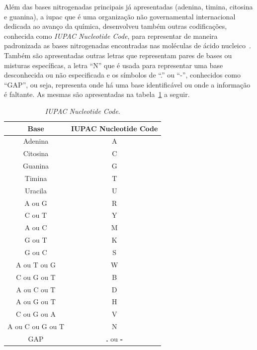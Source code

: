 Além das bases nitrogenadas principais já apresentadas (\gls{adenina}, \gls{timina}, \gls{citosina} e \gls{guanina}), a \gls{iupac} que é uma organização não governamental internacional dedicada ao avanço da química, desenvolveu também outras codificações, conhecida como \textit{IUPAC Nucleotide Code}, para representar de maneira padronizada as bases nitrogenadas encontradas nas moléculas de ácido nucleico~\cite{iupac_cornish_1985, iupac_hoppe_1986}. Também são apresentadas outras letras que representam pares de bases ou misturas específicas, a letra ``N'' que é usada para representar uma base desconhecida ou não especificada e os símbolos de ``.'' ou ``-'', conhecidos como ``GAP'', ou seja, representa onde há uma base identificável ou onde a informação é faltante\cite{iupac_cornish_1985}. As mesmas são apresentadas na tabela~\ref{tab:iupacNucleotideCode} a seguir.

\begin{table}[htb]
  \caption{\textit{IUPAC Nucleotide Code}.}
  \begin{center}
    \begin{tabular}{c|c}
      \hline
      Base             & IUPAC Nucleotide Code    \\
      \hline
      Adenina          & A                        \\
      Citosina         & C                        \\
      Guanina          & G                        \\
      Timina           & T                        \\
      Uracila          & U                        \\
      A ou G           & R                        \\
      C ou T           & Y                        \\
      A ou C           & M                        \\
      G ou T           & K                        \\
      G ou C           & S                        \\
      A ou T ou G      & W                        \\
      C ou G ou T      & B                        \\
      A ou C ou T      & D                        \\
      A ou G ou T      & H                        \\
      C ou G ou A      & V                        \\
      A ou C ou G ou T & N                        \\
      GAP              & \textbf{.} ou \textbf{-} \\
      \hline
    \end{tabular}
  \end{center}
  \label{tab:iupacNucleotideCode}
\end{table}

